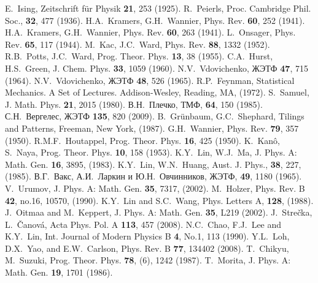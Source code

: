 \documentclass[utf8,12pt]{jetp}
\begin{document}
\begin{references}

 E.~Ising, Zeitschrift für Physik \textbf{21}, 253 (1925).
 R.~Peierls, Proc. Cambridge Phil. Soc., \textbf{32}, 477 (1936).
  H.A.~Kramers, G.H.~Wannier, Phys. Rev. \textbf{60}, 252 (1941).
  H.A.~Kramers, G.H.~Wannier, Phys. Rev. \textbf{60}, 263 (1941).
  L.~Onsager, Phys. Rev. \textbf{65}, 117 (1944).
 M.~Kac, J.C.~Ward, Phys. Rev. \textbf{88}, 1332 (1952).
 R.B.~Potts, J.C.~Ward, Prog. Theor. Phys. \textbf{13}, 38 (1955).
 C.A.~Hurst, H.S.~Green, J. Chem. Phys. \textbf{33}, 1059 (1960).
 N.V.~Vdovichenko, ЖЭТФ \textbf{47}, 715 (1964).
 N.V.~Vdovichenko, ЖЭТФ \textbf{48}, 526 (1965).
 R.P.~Feynman, Statistical Mechanics. A Set of Lectures. Addison-Wesley, Reading, MA, (1972).
 S.~Samuel, J. Math. Phys. \textbf{21}, 2015 (1980).
 В.Н.~Плечко, ТМФ, \textbf{64}, 150 (1985).
 С.Н.~Вергелес, ЖЭТФ \textbf{135}, 820 (2009).
 B.~Grünbaum, G.C.~Shephard, Tilings and Patterns, Freeman, New York, (1987).
  G.H.~Wannier, Phys. Rev. \textbf{79}, 357 (1950).
 R.M.F.~Houtappel, Prog. Theor. Phys. \textbf{16}, 425 (1950).
  K.~Kanô, S.~Naya, Prog. Theor. Phys. \textbf{10}, 158 (1953).
 K.Y.~Lin, W.J.~Ma, J. Phys. A: Math. Gen. \textbf{16}, 3895, (1983).
 K.Y.~Lin, W.N.~Huang, Aust. J. Phys., \textbf{38}, 227, (1985).
 В.Г.~Вакс, А.И.~Ларкин и Ю.Н.~Овчинников, ЖЭТФ, \textbf{49}, 1180 (1965).
 V.~Urumov, J. Phys. A: Math. Gen. \textbf{35}, 7317, (2002).
 M.~Holzer, Phys. Rev. B \textbf{42}, no.16, 10570, (1990).
 K.Y.~Lin and S.C.~Wang, Phys. Letters A, \textbf{128}, (1988).
 J.~Oitmaa and M.~Keppert, J. Phys. A: Math. Gen. \textbf{35}, L219 (2002).
 J.~Strečka, L.~Čanová, Acta Phys. Pol. A \textbf{113}, 457 (2008). 
 N.C.~Chao, F.J.~Lee and K.Y.~Lin, Int. Journal of Modern Physics B \textbf{4}, No.1, 113 (1990).
 Y.L.~Loh, D.X.~Yao, and E.W.~Carlson, Phys. Rev. B \textbf{77}, 134402 (2008).
 T.~Chikyu, M.~Suzuki, Prog. Theor. Phys. \textbf{78}, (6), 1242 (1987).
 T.~Morita, J. Phys. A: Math. Gen. \textbf{19}, 1701 (1986).

\end{references}
\end{document}
